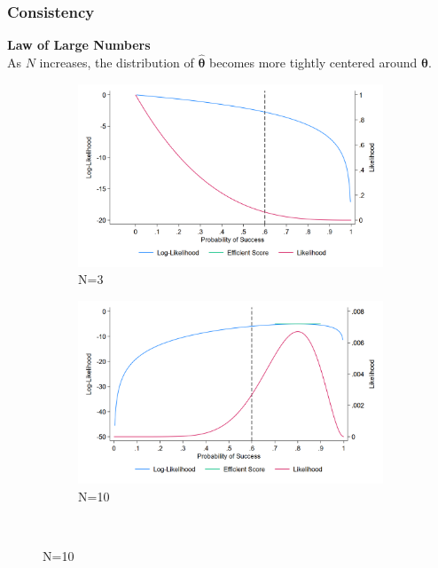 \documentclass[a4paper,12pt]{article}
\begin{document}
\newpage
\subsubsection*{Consistency}



    \textbf{Law of Large Numbers}\\
    As $N$ increases, the distribution of $\hat{\boldsymbol{\theta}}$ becomes more tightly centered around $\boldsymbol{\theta}$.



    \begin{figure}[H]
        \begin{subfigure}[c]{0.49\textwidth}
            \centering
            \includegraphics[width=1\textwidth]{figures/ll_3}
            \caption{N=3}
            \label{fig:distribution beta1 N3}
        \end{subfigure}%
        \begin{subfigure}[c]{0.49\textwidth}
            \centering
            \includegraphics[width=1\textwidth]{figures/ll_10}
            \caption{N=10}
            \label{fig:distribution beta1 N10}								
        \end{subfigure}\\


\end{figure}
\end{document}
